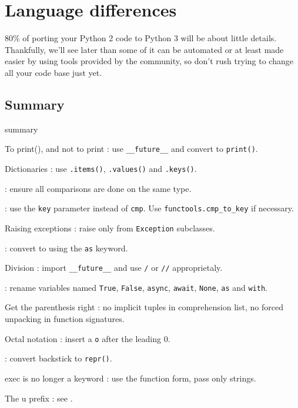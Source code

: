 
\chapter{Language differences}

80\% of porting your Python 2 code to Python 3 will be about little details. Thankfully, we'll see later than some of it can be automated or at least made easier by using tools provided by the community, so don't rush trying to change all your code base just yet.

\section{Summary}

\begin{labeling}{summary}
\item [To print(), and not to print]: use \lstinline{__future__} and convert to \lstinline{print()}.
\item [Dictionaries]: use \lstinline{.items()}, \lstinline{.values()} and \lstinline{.keys()}.
\item [Comparison operators]: ensure all comparisons are done on the same type.
\item [Comparison functions]: use the \lstinline{key} parameter instead of \lstinline{cmp}. Use \lstinline{functools.cmp_to_key} if necessary.
\item [Raising exceptions]: raise only from \lstinline{Exception} subclasses.
\item [Catching exceptions]: convert to using the \lstinline{as} keyword.
\item [Division]: import \lstinline{__future__} and use \lstinline{/} or \lstinline{//} approprietaly.
\item [Reserved keywords and constants]: rename variables named \lstinline{True}, \lstinline{False}, \lstinline{async}, \lstinline{await}, \lstinline{None}, \lstinline{as} and \lstinline{with}.
\item [Get the parenthesis right]: no implicit tuples in comprehension list, no forced unpacking in function signatures.
\item [Octal notation]: insert a \lstinline{o} after the leading 0.
\item [repr()]: convert backstick to \lstinline{repr()}.
\item [exec is no longer a keyword]: use the function form, pass only strings.
\item [The u prefix]: see .
\end{labeling}

